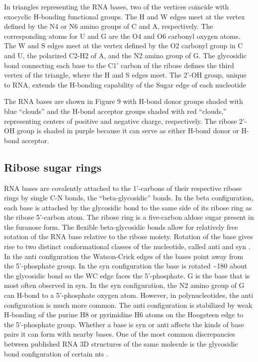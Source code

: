 In triangles representing the RNA bases, two of the vertices coincide with
exocyclic H-bonding functional groups. The H and W edges meet at the vertex
defined by the N4 or N6 amino groups of C and A, respectively. The corresponding
atoms for U and G are the O4 and O6 carbonyl oxygen atoms. The W and S edges
meet at the vertex defined by the O2 carbonyl group in C and U, the polarized
C2-H2 of A, and the N2 amino group of G. The glycosidic bond connecting each
base to the C1’ carbon of the ribose defines the third vertex of the triangle,
where the H and S edges meet. The 2'-OH group, unique to RNA, extends the
H-bonding capability of the Sugar edge of each nucleotide

The RNA bases are shown in Figure 9 with H-bond donor groups shaded with blue
``clouds'' and the H-bond acceptor groups shaded with red ``clouds,''
representing centers of positive and negative charge, respectively. The ribose
2'-OH group is shaded in purple because it can serve as either H-bond donor or
H-bond acceptor. 

\subsection{Ribose sugar rings}

RNA bases are covalently attached to the 1'-carbons of their respective ribose
rings by single C-N bonds, the ``beta-glycosidic'' bonds. In the beta
configuration, each base is attached by the glycosidic bond to the same side of
its ribose ring as the ribose 5'-carbon atom. The ribose ring is a five-carbon
aldose sugar present in the furanose form. The flexible beta-glycosidic bonds
allow for relatively free rotation of the RNA base relative to the ribose
moiety. Rotation of the base gives rise to two distinct conformational classes
of the nucleotide, called anti and syn \cite{Neidle2008}. In the anti
configuration the Watson-Crick edges of the bases point away from the
5’-phosphate group. In the syn configuration the base is rotated \textasciitilde 180\degree
about the glycosidic bond so the WC edge faces the 5'-phosphate. G is the base
that is most often observed in syn. In the syn configuration, the N2 amino group
of G can H-bond to a 5'-phosphate oxygen atom. However, in polynucleotides, the
anti configuration is much more common. The anti configuration is stabilized by
weak H-bonding of the purine H8 or pyrimidine H6 atoms on the Hoogsteen edge to
the 5'-phosphate group. Whether a base is syn or anti affects the kinds of base
pairs it can form with nearby bases. One of the most common discrepancies
between published RNA 3D structures of the same molecule is the glycosidic bond
configuration of certain nts \cite{Leontis2002f}. 

